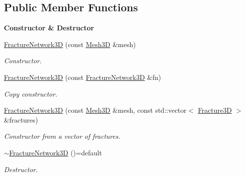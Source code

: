\subsection*{Public Member Functions}
\begin{Indent}{\bf Constructor \& Destructor}\par
\begin{DoxyCompactItemize}
\item 
\hyperlink{classFVCode3D_1_1FractureNetwork3D_a7e6918d382abdc58f2d5e2ef62a70333}{Fracture\+Network3D} (const \hyperlink{classFVCode3D_1_1Mesh3D}{Mesh3D} \&mesh)
\begin{DoxyCompactList}\small\item\em Constructor. \end{DoxyCompactList}\item 
\hyperlink{classFVCode3D_1_1FractureNetwork3D_aec3260df63b549a1be6170181e950a89}{Fracture\+Network3D} (const \hyperlink{classFVCode3D_1_1FractureNetwork3D}{Fracture\+Network3D} \&fn)
\begin{DoxyCompactList}\small\item\em Copy constructor. \end{DoxyCompactList}\item 
\hyperlink{classFVCode3D_1_1FractureNetwork3D_a2950c4567270d6802d43d3ae790e5bc4}{Fracture\+Network3D} (const \hyperlink{classFVCode3D_1_1Mesh3D}{Mesh3D} \&mesh, const std\+::vector$<$ \hyperlink{classFVCode3D_1_1Fracture3D}{Fracture3D} $>$ \&fractures)
\begin{DoxyCompactList}\small\item\em Constructor from a vector of fractures. \end{DoxyCompactList}\item 
\hyperlink{classFVCode3D_1_1FractureNetwork3D_a535802ea9935cb4daac9ec92a83bcfe7}{$\sim$\+Fracture\+Network3D} ()=default
\begin{DoxyCompactList}\small\item\em Destructor. \end{DoxyCompactList}\end{DoxyCompactItemize}
\end{Indent}
